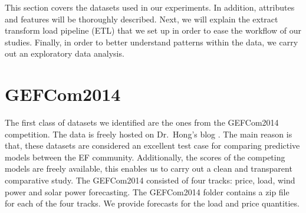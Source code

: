 






This section covers the datasets used in our experiments. In addition, attributes and features will be thoroughly described.
Next, we will explain the extract transform load pipeline (ETL) that we set up in order to ease the workflow of our studies.
Finally, in order to better understand patterns within the data, we carry out an exploratory data analysis.

\section{GEFCom2014}
The first class of datasets we identified are the ones from the GEFCom2014 competition. The data is freely hosted on Dr.\ Hong's blog \cite{hong2016probabilistic}.
The main reason is that, these datasets are considered an excellent test case for comparing predictive models between the EF community. Additionally, the scores of the competing models are freely available, this enables us to carry out a clean and transparent comparative study.
The GEFCom2014 consisted of four tracks: price, load, wind power and solar power forecasting. 
The GEFCom2014 folder contains a zip file for each of the four tracks.
We provide forecasts for the load and price quantities.
\\
